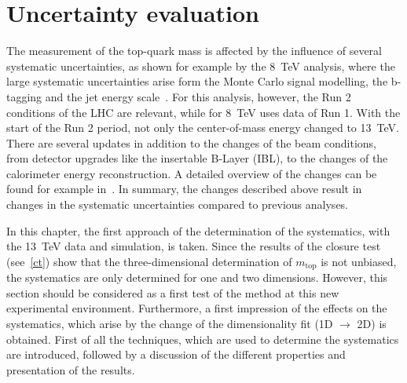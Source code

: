 \chapter{Uncertainty evaluation}
\label{sec:Uns}
The measurement of the top-quark mass is affected by the influence of several systematic uncertainties, as shown for example by the 8~TeV analysis, where the large systematic uncertainties arise form the Monte Carlo signal modelling, the b-tagging and the jet energy scale~\cite{ATLAS-CONF-2017-071}.  For this analysis, however, the Run 2 conditions of the LHC are relevant, while for 8~TeV uses data of Run 1. With the start of the Run 2 period, not only the center-of-mass energy  changed to 13~TeV. There are several updates in addition to the changes of the beam conditions, from  detector upgrades like the  insertable B-Layer (IBL), to the changes of the calorimeter energy reconstruction. A detailed overview of the changes can be found for example in~\cite{ATL-PHYS-PUB-2015-015}. In summary, 
the changes described above result in changes in the systematic uncertainties compared to previous analyses. 

In this chapter, the first approach of the determination of  the systematics, with the 13~TeV data and simulation, is taken. 
Since the results of the closure test (see~\cref{ct}) show that the three-dimensional determination of $m_{\text{top}}$ is not unbiased, the systematics are only determined for one and two dimensions. 
However, this section should be considered as a first test of the method at this new experimental environment.
Furthermore, a first impression of the effects on the systematics, which arise by the change  of the dimensionality  fit (1D $\rightarrow$ 2D) is obtained.
First of all the techniques, which are used to determine the systematics are introduced, followed by a discussion of the different properties and presentation of the results.   






